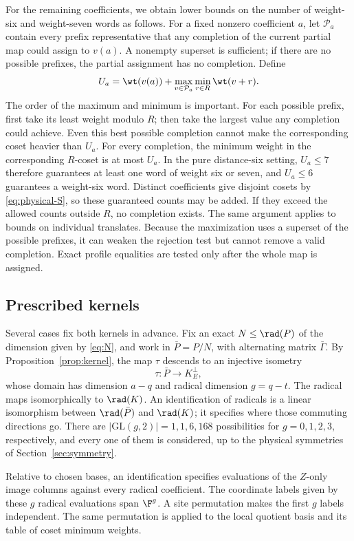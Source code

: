 For the remaining coefficients, we obtain lower bounds on the number
of weight-six and weight-seven words as follows.
For a fixed nonzero coefficient \(a\), let \(\mathcal P_a\) contain
every prefix representative that any completion of the current partial
map could assign to \(v(a)\). A nonempty superset is sufficient; if
there are no possible prefixes, the partial assignment has no completion.
Define
\[
 U_a=\wt(v(a))+\max_{v\in\mathcal P_a}\min_{r\in R}\wt(v+r).
\]
The order of the maximum and minimum is important. For each possible
prefix, first take its least weight modulo \(R\); then take the
largest value any completion could achieve. Even this best possible
completion cannot make the corresponding coset heavier than \(U_a\).
For every completion, the minimum weight in the corresponding
\(R\)-coset is at most \(U_a\). In the pure distance-six setting,
\(U_a\leq7\)
therefore guarantees at least one word of weight six or seven, and
\(U_a\leq6\) guarantees a weight-six word. Distinct coefficients
give disjoint cosets by \eqref{eq:physical-S}, so these guaranteed
counts may be added. If they exceed the allowed counts outside \(R\),
no completion exists. The same argument applies to bounds on individual
translates. Because the maximization uses a superset of the possible
prefixes, it can weaken the rejection test but cannot remove a valid
completion. Exact profile equalities are tested only after the whole
map is assigned.

\subsection{Prescribed kernels}\label{sec:fixedkernel}

Several cases fix both kernels in advance. Fix an exact
\(N\leq\rad(P)\) of the dimension given by \eqref{eq:N}, and work in
\(\bar P=P/N\), with alternating matrix \(\bar\Gamma\).
By Proposition~\ref{prop:kernel}, the map \(\tau\) descends to an
injective isometry
\[
 \tau:\bar P\longrightarrow K^\perp_E,
\]
whose domain has dimension \(a-q\) and radical dimension \(g=q-t\).
The radical maps isomorphically to \(\rad(K)\).
An identification of radicals is a linear isomorphism between
\(\rad(\bar P)\) and \(\rad(K)\); it specifies where those commuting
directions go. There are \(|\mathrm{GL}(g,2)|=1,1,6,168\) possibilities
for \(g=0,1,2,3\), respectively, and every one of them is considered,
up to the physical symmetries of Section~\ref{sec:symmetry}.

Relative to chosen bases, an identification specifies evaluations
of the \(Z\)-only image columns against every radical coefficient.
The coordinate labels given by these \(g\) radical evaluations span
\(\F^g\). A site permutation makes the first \(g\) labels
independent. The same permutation is applied to the local quotient
basis and its table of coset minimum weights.

